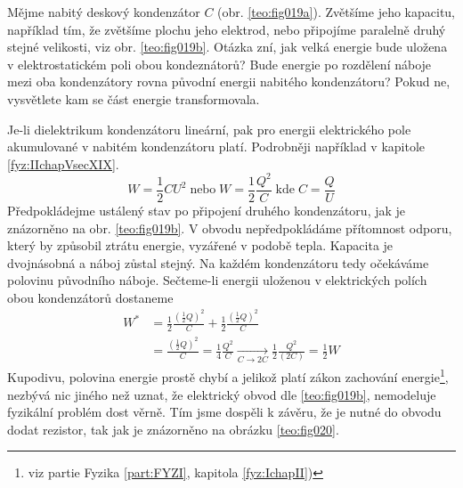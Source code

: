 \begin{mdframed}[style=mdexam]
  \begin{example}\label{teo:exam019}
    Mějme nabitý deskový kondenzátor \(C\) (obr. \ref{teo:fig019a}). Zvětšíme jeho kapacitu,
    například tím, že zvětšíme plochu jeho elektrod, nebo připojíme paralelně druhý stejné
    velikosti, viz obr. \ref{teo:fig019b}. Otázka zní, jak velká energie bude uložena v
    elektrostatickém poli obou kondeznátorů? Bude energie po rozdělení náboje mezi oba kondenzátory
    rovna původní energii nabitého kondenzátoru? Pokud ne, vysvětlete kam se část energie
    transformovala. 
    
    {\centering
      \captionsetup{type=figure}
      \hspace{2em}
      \hspace{3em}
      \label{teo:fig019}
    \par}
    
    Je-li dielektrikum kondenzátoru lineární, pak pro energii elektrického pole akumulované v
    nabitém kondenzátoru platí. Podrobněji například v kapitole \ref{fyz:IIchapVsecXIX}.
    \begin{equation}
      W = \frac{1}{2}CU^2 \;\text{nebo}\; W = \frac{1}{2}\frac{Q^2}{C} \;\text{kde}\; 
      C = \frac{Q}{U}
    \end{equation}
    Předpokládejme ustálený stav po připojení druhého kondenzátoru, jak je znázorněno na obr.
    \ref{teo:fig019b}. V obvodu nepředpokládáme přítomnost odporu, který by způsobil ztrátu energie,
    vyzářené v podobě tepla. Kapacita je dvojnásobná a náboj zůstal stejný. Na každém kondenzátoru
    tedy očekáváme polovinu původního náboje. Sečteme-li energii uloženou v elektrických polích obou
    kondenzátorů dostaneme
    \begin{align*}
      W^* &= \frac{1}{2}\frac{(\frac{1}{2}Q)^2}{C} + \frac{1}{2}\frac{(\frac{1}{2}Q)^2}{C}   \\
          &= \frac{(\frac{1}{2}Q)^2}{C} =\frac{1}{4}\frac{Q^2}{C}                 
           \xrightarrow[C\rightarrow2C]{}
            \frac{1}{2}\frac{Q^2}{(2C)} = \frac{1}{2}W 
    \end{align*}
    Kupodivu, polovina energie prostě chybí a jelikož platí zákon zachování energie\footnote{viz
    partie Fyzika \ref{part:FYZI}, kapitola \ref{fyz:IchapII})}, nezbývá nic jiného než uznat, že
    elektrický obvod dle \ref{teo:fig019b}, nemodeluje fyzikální problém dost věrně. Tím jsme
    dospěli k závěru, že je nutné do obvodu dodat rezistor, tak jak je znázorněno na obrázku
    \ref{teo:fig020}.
    

\end{example}
\end{mdframed}
